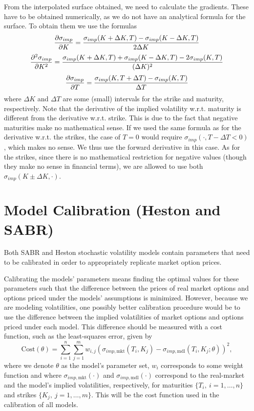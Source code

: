 From the interpolated surface obtained, we need to calculate the gradients. These have to be obtained numerically, as we do not have an analytical formula for the surface. To obtain them we use the formulas
\begin{equation}
\pdv{\sigma_{imp}}{K}(K,T)=\frac{\sigma_{imp}(K+\Delta K,T)-\sigma_{imp}(K-\Delta K,T)}{2\Delta K}
\end{equation}
\begin{equation}
\pdv{^2\sigma_{imp}}{K^2}(K,T)=\frac{\sigma_{imp}(K+\Delta K,T)+\sigma_{imp}(K-\Delta K,T)-2\sigma_{imp}(K,T)}{(\Delta K)^2}
\end{equation}
\begin{equation}
\pdv{\sigma_{imp}}{T}(K,T)=\frac{\sigma_{imp}(K,T+\Delta T)-\sigma_{imp}(K,T)}{\Delta T}
\end{equation}
\noindent where $\Delta K$ and $\Delta T$ are some (small) intervals for the strike and maturity, respectively. Note that the derivative of the implied volatility w.r.t. maturity is different from the derivative w.r.t. strike. This is due to the fact that negative maturities make no mathematical sense. If we used the same formula as for the derivative w.r.t. the strikes, the case of $T=0$ would require $\sigma_{imp}(\cdot,T-\Delta T<0)$, which makes no sense. We thus use the forward derivative in this case. As for the strikes, since there is no mathematical restriction for negative values (though they make no sense in financial terms), we are allowed to use both $\sigma_{imp}(K\pm\Delta K,\cdot)$.

 
\section{Model Calibration (Heston and SABR)}
\label{section:Model Calibration}
Both SABR and Heston stochastic volatility models contain parameters that need to be calibrated in order to appropriately replicate market option prices.


Calibrating the models' parameters means finding the optimal values for these parameters such that the difference between the prices of real market options and options priced under the models' assumptions is minimized. However, because we are modeling volatilities, one possibly better calibration procedure would be to use the difference between the implied volatilities of market options and options priced under each model. This difference should be measured with a cost function, such as the least-squares error, given by
\begin{equation}\label{cost}
\boxed{\mathrm{Cost}(\theta)=\sum_{i=1}^n\sum_{j=1}^mw_{i,j}\left(\sigma_{imp,\mathrm{mkt}}(T_i,K_j)-\sigma_{imp,\mathrm{mdl}}(T_i,K_j;\theta)\right)^2,}
\end{equation}
\noindent where we denote $\theta$ as the model's parameter set, $w_i$ corresponds to some weight function and where $\sigma_{imp,\mathrm{mkt}}(\cdot)$ and $\sigma_{imp,\mathrm{mdl}}(\cdot)$ correspond to the real-market and the model's implied volatilities, respectively, for maturities $\{T_i,\ i=1,\ldots,n\}$ and strikes $\{K_j,\ j=1,\ldots,m\}$. This will be the cost function used in the calibration of all models.




